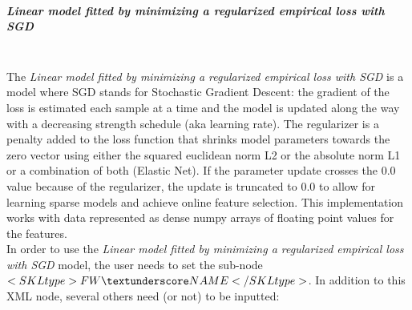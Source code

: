 \subparagraph{Linear model fitted by minimizing a regularized empirical loss with SGD}
\mbox{}
\\The \textit{Linear model fitted by minimizing a regularized empirical loss
with SGD} is a model where SGD stands for Stochastic Gradient Descent: the gradient of the loss is estimated each sample at a time and the model is updated along the way with a decreasing strength schedule (aka learning rate).
The regularizer is a penalty added to the loss function that shrinks model parameters towards the zero vector using either the squared euclidean norm L2 or the absolute norm L1 or a combination of both (Elastic Net). If the parameter update crosses the 0.0 value because of the regularizer, the update is truncated to 0.0 to allow for learning sparse models and achieve online feature selection.
This implementation works with data represented as dense numpy arrays of floating point values for the features.
 \\In order to use the \textit{Linear model fitted by
minimizing a regularized empirical loss with SGD} model, the user needs to set the sub-node
$<SKLtype>FW\textunderscore NAME</SKLtype>$.
In addition to this XML node, several others need (or not) to be inputted:
